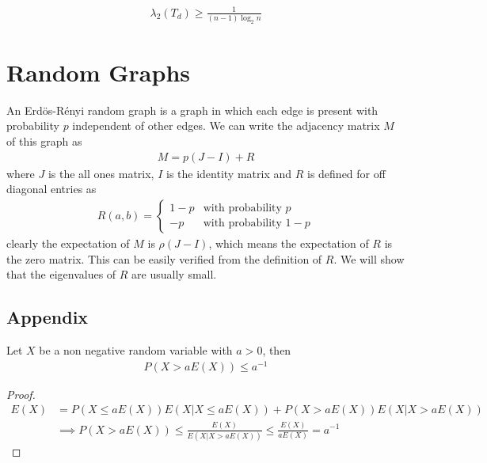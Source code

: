 \documentclass{math}
\begin{document}
\begin{lemma}
    \begin{align*}
        \lambda_2(T_d) \geq \frac{1}{(n - 1) \log_2 n}        
    \end{align*}
\end{lemma}

\section{Random Graphs}

An Erd\"{o}s-R\'{e}nyi random graph is a graph in which each edge is present with probability $p$ independent of other edges.
We can write the adjacency matrix $M$ of this graph as
\begin{align*}
    M = p(J - I) + R
\end{align*}
where $J$ is the all ones matrix, $I$ is the identity matrix and $R$ is defined for off diagonal entries as
\begin{align*}
    R(a, b) = \begin{cases}
        1 - p & \text{with probability $p$} \\
        -p & \text{with probability $1-p$}
    \end{cases}
\end{align*}
clearly the expectation of $M$ is $\rho(J - I)$, which means the expectation of $R$ is the zero matrix.
This can be easily verified from the definition of $R$. We will show that the eigenvalues of $R$ are usually small.

\subsection{Appendix}

\begin{theorem}
    Let $X$ be a non negative random variable with $a > 0$, then
    \begin{align*}
        P(X > a E(X)) \leq a^{-1}
    \end{align*}
\end{theorem}
\begin{proof}
    \begin{align*}
        E(X) &= P(X \leq a E(X)) E(X | X \leq a E(X)) + P(X > a E(X)) E(X | X > a E(X)) \\
        &\implies P(X > a E(X)) \leq \frac{E(X)}{E(X | X > aE(X))} \leq \frac{E(X)}{aE(X)} = a^{-1}
    \end{align*}
\end{proof}
\end{document}
